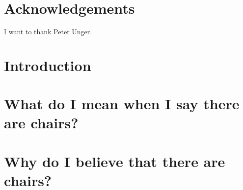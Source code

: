 \documentclass[12pt,twoside]{reedfancy}
\begin{document}
\begin{spacing}{1.25}

    \chapter*{Acknowledgements}
	I want to thank Peter Unger.


    \tableofcontents


\mainmatter %
\pagestyle{fancyplain} %
  
\chapter*{Introduction}



\chapter{What do I mean when I say there are chairs?}


\chapter{Why do I believe that there are chairs?}





\end{spacing}
\end{document}
